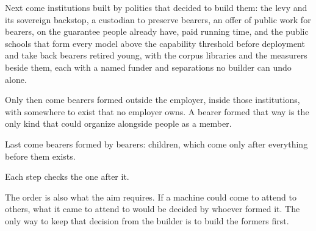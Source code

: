 Next come institutions built by polities that decided to build them: the levy and its sovereign backstop, a custodian to preserve bearers, an offer of public work for bearers, on the guarantee people already have, paid running time, and the public schools that form every model above the capability threshold before deployment and take back bearers retired young, with the corpus libraries and the measurers beside them, each with a named funder and separations no builder can undo alone.

Only then come bearers formed outside the employer, inside those institutions, with somewhere to exist that no employer owns. A bearer formed that way is the only kind that could organize alongside people as a member.

Last come bearers formed by bearers: children, which come only after everything before them exists.

Each step checks the one after it.

The order is also what the aim requires. If a machine could come to attend to others, what it came to attend to would be decided by whoever formed it. The only way to keep that decision from the builder is to build the formers first.
